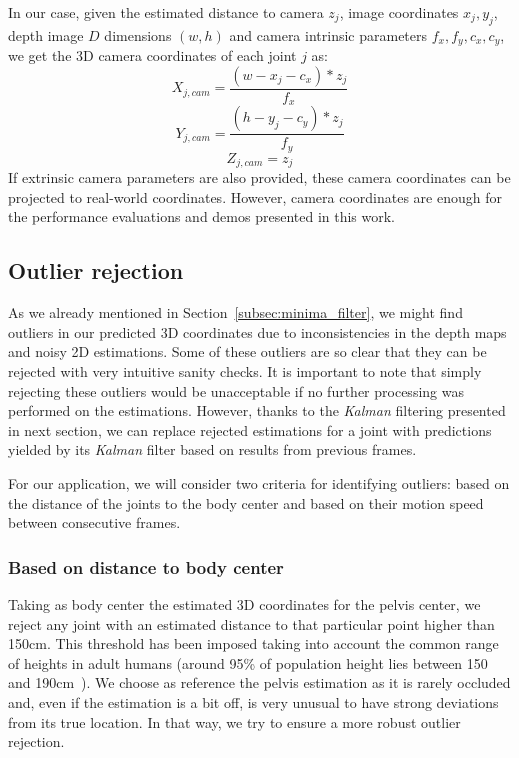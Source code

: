 In our case, given the estimated distance to camera \(z_j\), image coordinates \(x_j, y_j\), depth image \(D\) dimensions \((w, h)\) and camera intrinsic parameters \(f_x, f_y, c_x, c_y\), we get the 3D camera coordinates of each joint \(j\) as:
\begin{equation}
    X_{j, cam} = \frac{(w - x_j - c_x) * z_j}{f_x}
\end{equation}\label{eq:3d_coordinates_x}
\begin{equation}
    Y_{j, cam} = \frac{(h - y_j - c_y) * z_j}{f_y}
\end{equation}\label{eq:3d_coordinates_y}
\begin{equation}
    Z_{j, cam} = z_j
\end{equation}\label{eq:3d_coordinates_z}
If extrinsic camera parameters are also provided, these camera coordinates can be projected to real-world coordinates. However, camera coordinates are enough for the performance evaluations and demos presented in this work.

\subsection{Outlier rejection}\label{subsec:outlier_rejection}
As we already mentioned in Section~\ref{subsec:minima_filter}, we might find outliers in our predicted 3D coordinates due to inconsistencies in the depth maps and noisy 2D estimations. Some of these outliers are so clear that they can be rejected with very intuitive sanity checks. It is important to note that simply rejecting these outliers would be unacceptable if no further processing was performed on the estimations. However, thanks to the \emph{Kalman} filtering presented in next section, we can replace rejected estimations for a joint with predictions yielded by its \emph{Kalman} filter based on results from previous frames.

For our application, we will consider two criteria for identifying outliers: based on the distance of the joints to the body center and based on their motion speed between consecutive frames.

\subsubsection{Based on distance to body center}
Taking as body center the estimated 3D coordinates for the pelvis center, we reject any joint with an estimated distance to that particular point higher than 150cm. This threshold has been imposed taking into account the common range of heights in adult humans (around 95\% of population height lies between 150 and 190cm~\cite{roser2013human}). We choose as reference the pelvis estimation as it is rarely occluded and, even if the estimation is a bit off, is very unusual to have strong deviations from its true location. In that way, we try to ensure a more robust outlier rejection.

